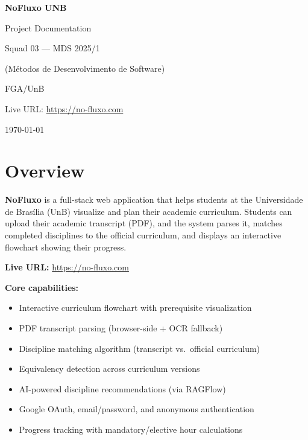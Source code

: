 \documentclass[11pt,a4paper]{article}
\begin{document}
\begin{titlepage}
    \centering
    \vspace*{4cm}
    {\Huge\bfseries NoFluxo UNB\par}
    \vspace{0.6cm}
    {\LARGE Project Documentation\par}
    \vspace{2cm}
    {\large Squad 03 — MDS 2025/1\par}
    {\large (Métodos de Desenvolvimento de Software)\par}
    {\large FGA/UnB\par}
    \vspace{1.5cm}
    {\large Live URL: \url{https://no-fluxo.com}\par}
    \vfill
    {\large \today\par}
\end{titlepage}

\tableofcontents
\newpage

\section{Overview}

\textbf{NoFluxo} is a full-stack web application that helps students at the
Universidade de Brasília (UnB) visualize and plan their academic curriculum.
Students can upload their academic transcript (PDF), and the system parses it,
matches completed disciplines to the official curriculum, and displays an
interactive flowchart showing their progress.

\medskip
\noindent\textbf{Live URL:} \url{https://no-fluxo.com}

\medskip
\noindent\textbf{Core capabilities:}
\begin{itemize}[noitemsep]
    \item Interactive curriculum flowchart with prerequisite visualization
    \item PDF transcript parsing (browser-side + OCR fallback)
    \item Discipline matching algorithm (transcript vs.\ official curriculum)
    \item Equivalency detection across curriculum versions
    \item AI-powered discipline recommendations (via RAGFlow)
    \item Google OAuth, email/password, and anonymous authentication
    \item Progress tracking with mandatory/elective hour calculations
\end{itemize}
\end{document}
